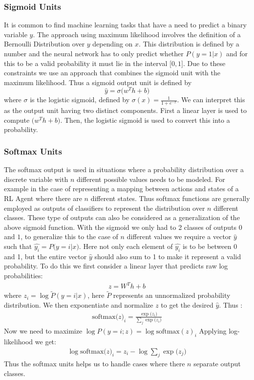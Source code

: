 \documentclass[14pt]{extarticle}
\numberwithin{equation}{section}
\begin{document}
	\subsubsection{Sigmoid Units}		
	It is common to find machine learning tasks that have a need to predict a binary variable $y$. The approach using maximum likelihood involves the definition of a Bernoulli Distribution over $y$ depending on $x$. This distribution is defined by a number and the neural network has to only predict whether $P(y=1 | x)$ and for this to be a valid probability it must lie in the interval $\big[0,1\big]$. Due to these constraints we use an approach that combines the sigmoid unit with the maximum likelihood. Thus a sigmoid output unit is defined by 
	\begin{equation}
	\hat{y} = \sigma\big(w^T h + b\big)
	\end{equation}
	where $\sigma$ is the logistic sigmoid, defined by $\sigma(x) = \frac{1}{1 + e^{-x} }$. We can interpret this as the output unit having two distinct components. First a linear layer is used to compute $\big(w^T h + b\big)$. Then, the logistic sigmoid is used to convert this into a probability.
	\subsubsection{Softmax Units}		\label{softmax}
	The softmax output is used in situations where a probability distribution over a discrete variable with $n$ different possible values needs to be modeled. For example in the case of representing a mapping between actions and states of a RL Agent where there are $n$ different states. Thus softmax functions are generally employed as outputs of classifiers to represent the distribution over $n$ different classes. These type of outputs can also be considered as a generalization of the above sigmoid function. With the sigmoid we only had to 2 classes of outputs $0$ and $1$, to generalize this to the case of $n$ different values we require a vector $\hat{y}$ such that $\hat{y_i} = P\big(y=i | x\big)$. Here not only each element of $\hat{y_i}$ is to be between 0 and 1, but the entire vector $\hat{y}$ should also sum to 1 to make it represent a valid probability. To do this we first consider a linear layer that predicts raw log probabilities:
	\begin{align}
	z = W^T h + b 
	\end{align} 
	where $z_i =\log \tilde{P}(y = i | x)$, here $\tilde{P}$ represents an unnormalized probability distribution. We then exponentiate and normalize $z$ to get the desired $\hat{y}$. Thus :
	\begin{align}
	\text{softmax}\big(z\big)_i = \frac{\exp\big(z_i\big)}{\sum_{j}\exp\big(z_i\big)}
	\end{align}
	Now we need to maximize $\log P(y=i;z) = \log \text{softmax}(z)_i $ Applying log-likelihood we get:
	\begin{align}
	\log \text{softmax}\big(z\big)_i = z_i - \log \sum_{j}\exp\big(z_j\big)
	\end{align}
	Thus the softmax units helps us to handle cases where there $n$ separate output classes.
\end{document}
